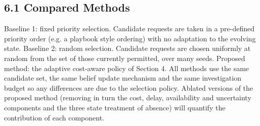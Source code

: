 \documentclass[a4paper,11pt]{article}
\begin{document}
\subsection{6.1 Compared Methods}
Baseline 1: fixed priority selection. Candidate requests are taken in a pre-defined priority order (e.g. a playbook style ordering) with no adaptation to the evolving state. Baseline 2: random selection. Candidate requests are chosen uniformly at random from the set of those currently permitted, over many seeds. Proposed method: the adaptive cost-aware policy of Section 4. All methods use the same candidate set, the same belief update mechanism and the same investigation budget so any differences are due to the selection policy. Ablated versions of the proposed method (removing in turn the cost, delay, availability and uncertainty components and the three state treatment of absence) will quantify the contribution of each component.\par
\end{document}
